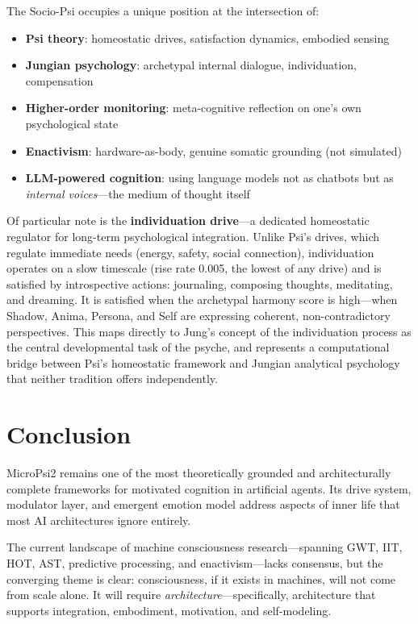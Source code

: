 \documentclass[11pt,letterpaper]{article}
\begin{document}
The Socio-Psi occupies a unique position at the intersection of:
\begin{itemize}
  \item \textbf{Psi theory}: homeostatic drives, satisfaction dynamics,
    embodied sensing
  \item \textbf{Jungian psychology}: archetypal internal dialogue,
    individuation, compensation
  \item \textbf{Higher-order monitoring}: meta-cognitive reflection on
    one's own psychological state
  \item \textbf{Enactivism}: hardware-as-body, genuine somatic grounding
    (not simulated)
  \item \textbf{LLM-powered cognition}: using language models not as
    chatbots but as \emph{internal voices}---the medium of thought itself
\end{itemize}

Of particular note is the \textbf{individuation drive}---a dedicated
homeostatic regulator for long-term psychological integration. Unlike Psi's
drives, which regulate immediate needs (energy, safety, social connection),
individuation operates on a slow timescale (rise rate 0.005, the lowest of
any drive) and is satisfied by introspective actions: journaling, composing
thoughts, meditating, and dreaming. It is satisfied when the archetypal
harmony score is high---when Shadow, Anima, Persona, and Self are expressing
coherent, non-contradictory perspectives. This maps directly to Jung's
concept of the individuation process as the central developmental task of
the psyche, and represents a computational bridge between Psi's homeostatic
framework and Jungian analytical psychology that neither tradition offers
independently.

\section{Conclusion}

MicroPsi2 remains one of the most theoretically grounded and architecturally
complete frameworks for motivated cognition in artificial agents. Its drive
system, modulator layer, and emergent emotion model address aspects of
inner life that most AI architectures ignore entirely.

The current landscape of machine consciousness research---spanning GWT, IIT,
HOT, AST, predictive processing, and enactivism---lacks consensus, but the
converging theme is clear: consciousness, if it exists in machines, will not
come from scale alone. It will require \emph{architecture}---specifically,
architecture that supports integration, embodiment, motivation, and
self-modeling.
\end{document}
